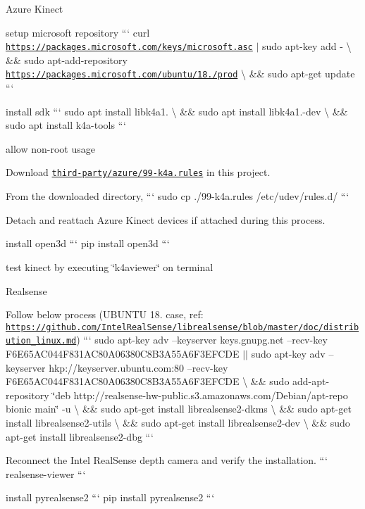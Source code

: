 
\begin{DoxyItemize}
\item Azure Kinect
\begin{DoxyItemize}
\item setup microsoft repository ``` curl \href{https://packages.microsoft.com/keys/microsoft.asc}{\tt https\+://packages.\+microsoft.\+com/keys/microsoft.\+asc} $\vert$ sudo apt-\/key add -\/ \textbackslash{} \&\& sudo apt-\/add-\/repository \href{https://packages.microsoft.com/ubuntu/18.04/prod}{\tt https\+://packages.\+microsoft.\+com/ubuntu/18./prod} \textbackslash{} \&\& sudo apt-\/get update ```
\item install sdk ``` sudo apt install libk4a1. \textbackslash{} \&\& sudo apt install libk4a1.-\/dev \textbackslash{} \&\& sudo apt install k4a-\/tools ```
\item allow non-\/root usage
\begin{DoxyItemize}
\item Download \href{../third-party/azure/99-k4a.rules}{\tt third-\/party/azure/99-\/k4a.\+rules} in this project.
\item From the downloaded directory, ``` sudo cp ./99-\/k4a.rules /etc/udev/rules.d/ ```
\end{DoxyItemize}
\item Detach and reattach Azure Kinect devices if attached during this process.
\item install open3d ``` pip install open3d ```
\item test kinect by executing \char`\"{}k4aviewer\char`\"{} on terminal
\end{DoxyItemize}
\item Realsense
\begin{DoxyItemize}
\item Follow below process (U\+B\+U\+N\+TU 18. case, ref\+: \href{https://github.com/IntelRealSense/librealsense/blob/master/doc/distribution_linux.md}{\tt https\+://github.\+com/\+Intel\+Real\+Sense/librealsense/blob/master/doc/distribution\+\_\+linux.\+md}) ``` sudo apt-\/key adv --keyserver keys.\+gnupg.\+net --recv-\/key F6\+E65\+A\+C044\+F831\+A\+C80\+A06380\+C8\+B3\+A55\+A6\+F3\+E\+F\+C\+DE $\vert$$\vert$ sudo apt-\/key adv --keyserver hkp\+://keyserver.ubuntu.\+com\+:80 --recv-\/key F6\+E65\+A\+C044\+F831\+A\+C80\+A06380\+C8\+B3\+A55\+A6\+F3\+E\+F\+C\+DE \textbackslash{} \&\& sudo add-\/apt-\/repository \char`\"{}deb http\+://realsense-\/hw-\/public.\+s3.\+amazonaws.\+com/\+Debian/apt-\/repo bionic main\char`\"{} -\/u \textbackslash{} \&\& sudo apt-\/get install librealsense2-\/dkms \textbackslash{} \&\& sudo apt-\/get install librealsense2-\/utils \textbackslash{} \&\& sudo apt-\/get install librealsense2-\/dev \textbackslash{} \&\& sudo apt-\/get install librealsense2-\/dbg ```
\item Reconnect the Intel Real\+Sense depth camera and verify the installation. ``` realsense-\/viewer ```
\item install pyrealsense2 ``` pip install pyrealsense2 ```
\end{DoxyItemize}
\end{DoxyItemize}

